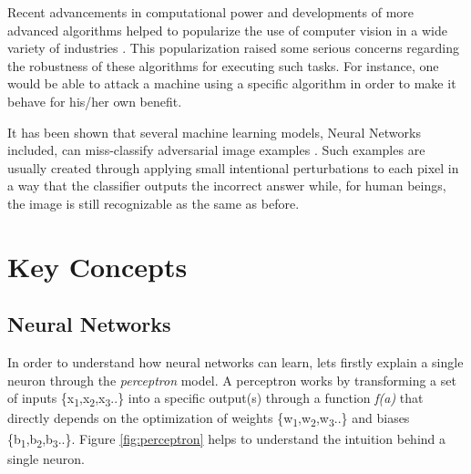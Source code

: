 \documentclass{article}
\begin{document}
Recent advancements in computational power and developments of more advanced algorithms helped to popularize the use of computer vision in a wide variety of industries \cite{billovits}. This popularization raised some serious concerns regarding the robustness of these algorithms for executing such tasks. For instance, one would be able to attack a machine using a specific algorithm in order to make it behave for his/her own benefit.

It has been shown that several machine learning models, Neural Networks included, can miss-classify adversarial image examples \cite{goodfellow2014}. Such examples are usually created through applying small intentional perturbations to each pixel in a way that the classifier outputs the incorrect answer while, for human beings, the image is still recognizable as the same as before.

\section{Key Concepts}\label{sec:key_concepts}

\subsection{Neural Networks}\label{subsec:neural_deep}

In order to understand how neural networks can learn, lets firstly explain a single neuron through the \textit{perceptron} model. A perceptron works by transforming a set of inputs \{x\textsubscript{1},x\textsubscript{2},x\textsubscript{3}..\} into a specific output(s) through a function \textit{f(a)} that directly depends on the optimization of weights \{w\textsubscript{1},w\textsubscript{2},w\textsubscript{3}..\} and biases \{b\textsubscript{1},b\textsubscript{2},b\textsubscript{3}..\}\cite{nielsen2016}. Figure \ref{fig:perceptron}  helps to understand the intuition behind a single neuron.
\end{document}
